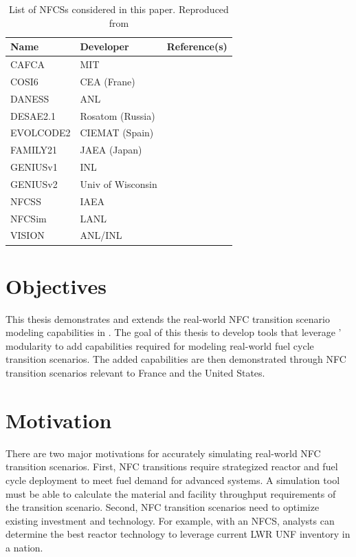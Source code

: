 \begin{table}[h]
	\centering
	\caption{List of \glspl{NFCS} considered in this paper.
		Reproduced from \cite{huff_next_2010}}
	\label{tab:fcs}
	\begin{tabular}{lll}
		\hline
		Name & Developer & Reference(s) \\
		\hline
		CAFCA & MIT & \cite{guerin_benchmark_2009}\\
		COSI6 & CEA (Frane) & \cite{eschbach_new_2013} \\
		DANESS & ANL & \cite{van_den_durpel_daness:_2006}\\
		DESAE2.1 & Rosatom (Russia) & \cite{tsibulskiy_desae_2006}\\
		EVOLCODE2 & CIEMAT (Spain) & \cite{alvarez-velarde_validation_2014}\\
		FAMILY21 & JAEA (Japan) & \cite{oecd_nuclear_2009}\\
		GENIUSv1 & INL & \cite{dunzik-gougar_global_2007}\\
		GENIUSv2 & Univ of Wisconsin & \cite{dunn_genius_2009}\\
		NFCSS & IAEA & \cite{iaea_guidance_2008}\\
		NFCSim & LANL & \cite{schneider_nfcsim:_2005} \\
		VISION & ANL/INL & \cite{jacobson_verifiable_2010} \\
		\hline
	\end{tabular}
\end{table}


\section{Objectives}

This thesis demonstrates and extends the real-world \gls{NFC} transition
scenario modeling capabilities in \Cyclus. 
The goal of this thesis to
develop tools that leverage \Cyclus' modularity to
add capabilities required for modeling real-world
fuel cycle transition scenarios. The added capabilities are then
demonstrated through \gls{NFC} transition scenarios relevant to France and the United
States.

\section{Motivation}

There are two major motivations for accurately simulating
real-world \gls{NFC} transition scenarios.
First, \gls{NFC} transitions require strategized reactor
and fuel cycle deployment to meet fuel demand for advanced systems.
A simulation tool must be able to calculate the material
and facility throughput requirements of the transition scenario.
Second, \gls{NFC} transition scenarios need to optimize
existing investment and technology. For example, with an \gls{NFCS},
analysts can determine the best reactor technology
to leverage current \gls{LWR} \gls{UNF} inventory in a nation.


